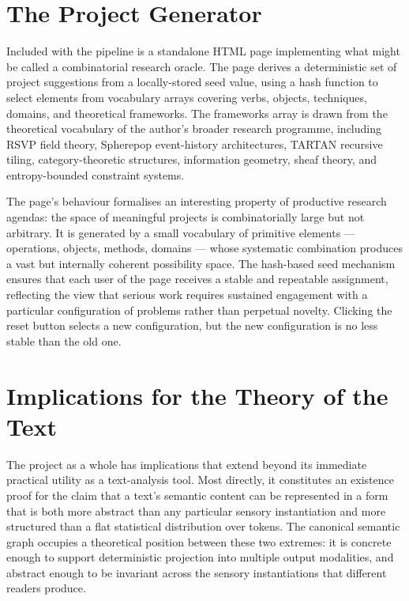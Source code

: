\documentclass[12pt, a4paper]{article}
\begin{document}
\section{The Project Generator}

Included with the pipeline is a standalone HTML page implementing what might be called a combinatorial research oracle. The page derives a deterministic set of project suggestions from a locally-stored seed value, using a hash function to select elements from vocabulary arrays covering verbs, objects, techniques, domains, and theoretical frameworks. The frameworks array is drawn from the theoretical vocabulary of the author's broader research programme, including RSVP field theory, Spherepop event-history architectures, TARTAN recursive tiling, category-theoretic structures, information geometry, sheaf theory, and entropy-bounded constraint systems.

The page's behaviour formalises an interesting property of productive research agendas: the space of meaningful projects is combinatorially large but not arbitrary. It is generated by a small vocabulary of primitive elements — operations, objects, methods, domains — whose systematic combination produces a vast but internally coherent possibility space. The hash-based seed mechanism ensures that each user of the page receives a stable and repeatable assignment, reflecting the view that serious work requires sustained engagement with a particular configuration of problems rather than perpetual novelty. Clicking the reset button selects a new configuration, but the new configuration is no less stable than the old one.

\section{Implications for the Theory of the Text}

The project as a whole has implications that extend beyond its immediate practical utility as a text-analysis tool. Most directly, it constitutes an existence proof for the claim that a text's semantic content can be represented in a form that is both more abstract than any particular sensory instantiation and more structured than a flat statistical distribution over tokens. The canonical semantic graph occupies a theoretical position between these two extremes: it is concrete enough to support deterministic projection into multiple output modalities, and abstract enough to be invariant across the sensory instantiations that different readers produce.
\end{document}
